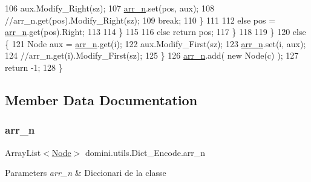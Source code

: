 \begin{DoxyCode}
106                         aux.Modify\_Right(sz);
107                         \hyperlink{classdomini_1_1utils_1_1Dict__Encode_abc506ae01222e16d9b6581efbdad1a97}{arr\_n}.set(pos, aux);
108                         \textcolor{comment}{//arr\_n.get(pos).Modify\_Right(sz);}
109                         \textcolor{keywordflow}{break};
110                     \}
111 
112                     \textcolor{keywordflow}{else} pos = \hyperlink{classdomini_1_1utils_1_1Dict__Encode_abc506ae01222e16d9b6581efbdad1a97}{arr\_n}.get(pos).Right;
113 
114                 \}
115 
116                 \textcolor{keywordflow}{else} \textcolor{keywordflow}{return} pos;
117             \}
118 
119         \}
120         \textcolor{keywordflow}{else} \{
121             Node aux = \hyperlink{classdomini_1_1utils_1_1Dict__Encode_abc506ae01222e16d9b6581efbdad1a97}{arr\_n}.get(i);
122             aux.Modify\_First(sz);
123             \hyperlink{classdomini_1_1utils_1_1Dict__Encode_abc506ae01222e16d9b6581efbdad1a97}{arr\_n}.set(i, aux);
124             \textcolor{comment}{//arr\_n.get(i).Modify\_First(sz);}
125         \}
126         \hyperlink{classdomini_1_1utils_1_1Dict__Encode_abc506ae01222e16d9b6581efbdad1a97}{arr\_n}.add( \textcolor{keyword}{new} Node(c) );
127         \textcolor{keywordflow}{return} -1;
128     \}
\end{DoxyCode}


\subsection{Member Data Documentation}
\mbox{\label{classdomini_1_1utils_1_1Dict__Encode_abc506ae01222e16d9b6581efbdad1a97}} 
\subsubsection{\texorpdfstring{arr\+\_\+n}{arr\_n}}
{\footnotesize\ttfamily Array\+List$<$\hyperlink{classdomini_1_1utils_1_1Node}{Node}$>$ domini.\+utils.\+Dict\+\_\+\+Encode.\+arr\+\_\+n\hspace{0.3cm}{\ttfamily [private]}}


\begin{DoxyParams}{Parameters}
{\em arr\+\_\+n} & Diccionari de la classe \\
\hline
\end{DoxyParams}
\mbox{\label{classdomini_1_1utils_1_1Dict__Encode_a48fe9a878056a119ad36a0aad2727a13}} 
